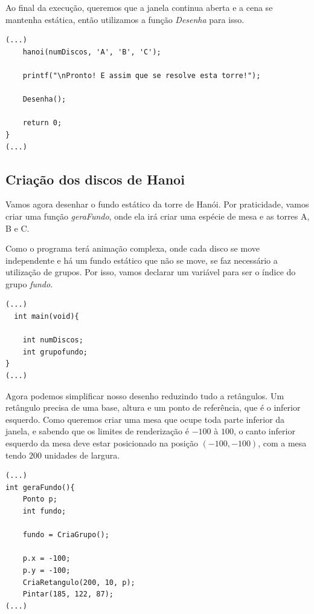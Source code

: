 Ao final da execução, queremos que a janela continua aberta e a cena se mantenha estática, então utilizamos a função \emph{Desenha} para isso.

 \begin{lstlisting}[caption={Mantendo cena estática.}, style=tuto] 
 (...)
    hanoi(numDiscos, 'A', 'B', 'C');

    printf("\nPronto! E assim que se resolve esta torre!");
    
    Desenha();

    return 0;
}
(...)
\end{lstlisting}

%


\subsection{Criação dos discos de Hanoi}
Vamos agora desenhar o fundo estático da torre de Hanói. Por praticidade, vamos criar uma função \emph{geraFundo}, onde ela irá criar uma espécie de mesa e as torres A, B e C.

Como o programa terá animação complexa, onde cada disco se move independente e há um fundo estático que não se move, se faz necessário a utilização de grupos. Por isso, vamos declarar um variável para ser o índice do grupo \emph{fundo}.

 \begin{lstlisting}[caption={Variável para o grupo \emph{fundo}.}, style=tuto] 
 (...)
  int main(void){

    int numDiscos;
    int grupofundo;
}
(...)
\end{lstlisting}

Agora podemos simplificar nosso desenho reduzindo tudo a retângulos. Um retângulo precisa de uma base, altura e um ponto de referência, que é o inferior esquerdo. Como queremos criar uma mesa que ocupe toda parte inferior da janela, e sabendo que os limites de renderização é $-100$ à $100$, o canto inferior esquerdo da mesa deve estar posicionado na posição $(-100, -100)$, com a mesa tendo $200$ unidades de largura.

%
 \begin{lstlisting}[caption={Mesa.}, style=tuto] 
(...)
int geraFundo(){
    Ponto p;
    int fundo;

    fundo = CriaGrupo();

    p.x = -100;
    p.y = -100;
    CriaRetangulo(200, 10, p);
    Pintar(185, 122, 87);
(...)
\end{lstlisting}

